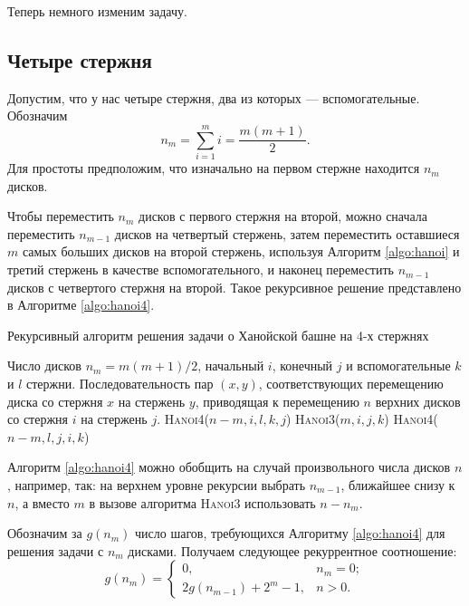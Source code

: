 \documentclass[a4paper,12pt]{article}
\newcommand{\algname}[1]{\textsc{#1}}
\begin{document}
Теперь немного изменим задачу.
\subsection{Четыре стержня}

Допустим, что у нас четыре стержня, два из которых --- вспомогательные. Обозначим
\[n_m = \sum_{i=1}^mi = \frac{m(m+1)}{2}.\]
Для простоты предположим, что изначально на первом стержне находится $n_m$ дисков.

Чтобы переместить $n_m$ дисков с первого стержня на второй, можно сначала переместить $n_{m-1}$ дисков на четвертый стержень, затем переместить оставшиеся $m$ самых больших дисков на второй стержень, используя Алгоритм \ref{algo:hanoi} и третий стержень в качестве вспомогательного, и наконец переместить $n_{m-1}$ дисков с четвертого стержня на второй. Такое рекурсивное решение представлено в Алгоритме \ref{algo:hanoi4}.

\begin{algorithm}[H]
	\caption{Рекурсивный алгоритм решения задачи о Ханойской башне на 4-х стержнях}
	\label{algo:hanoi4}
	\begin{algorithmic}[1]
		\Require Число дисков $n_m = m(m+1)/2$, начальный $i$, конечный $j$ и вспомогательные $k$ и $l$ стержни.
		\Ensure Последовательность пар $(x, y)$, соответствующих перемещению диска со стержня $x$ на стержень $y$, приводящая к перемещению $n$ верхних дисков со стержня $i$ на стержень $j$.
				\State \textsc{Hanoi4}($n-m,i,l,k,j$)
				\State \textsc{Hanoi3}($m,i,j,k$)
				\State \textsc{Hanoi4}($n-m,l,j,i,k$)
			\EndIf
		\EndFunction
	\end{algorithmic}
\end{algorithm}

Алгоритм \ref{algo:hanoi4} можно обобщить на случай произвольного числа дисков $n$, например, так: на верхнем уровне рекурсии выбрать $n_{m-1}$, ближайшее снизу к $n$, а вместо $m$ в вызове алгоритма \algname{Hanoi3} использовать $n - n_m$.

Обозначим за $g(n_m)$ число шагов, требующихся Алгоритму \ref{algo:hanoi4} для решения задачи с $n_m$ дисками. Получаем следующее рекуррентное соотношение:
\[g(n_m) = \begin{cases}
	0, & n_m = 0; \\
	2g(n_{m-1}) + 2^m - 1, & n > 0.
	\end{cases}\]
\end{document}
